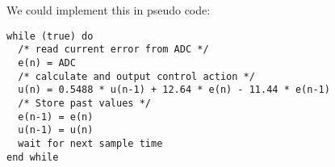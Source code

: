 We could implement this in pseudo code:
\begin{verbatim}
while (true) do
  /* read current error from ADC */
  e(n) = ADC
  /* calculate and output control action */
  u(n) = 0.5488 * u(n-1) + 12.64 * e(n) - 11.44 * e(n-1)
  /* Store past values */
  e(n-1) = e(n)
  u(n-1) = u(n)
  wait for next sample time
end while
\end{verbatim}
\endinput
